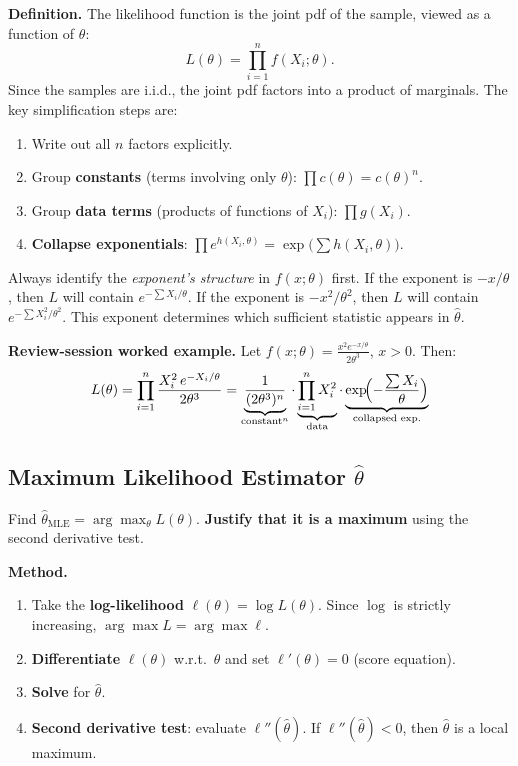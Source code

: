 \documentclass[11pt,a4paper]{article}
\begin{document}
\textbf{Definition.} The likelihood function is the joint pdf of the sample, viewed as a function of $\theta$:
\[
  L(\theta) = \prod_{i=1}^n f(X_i;\theta).
\]
Since the samples are i.i.d., the joint pdf factors into a product of marginals. The key simplification steps are:

\begin{enumerate}[leftmargin=2em]
  \item Write out all $n$ factors explicitly.
  \item Group \textbf{constants} (terms involving only $\theta$): $\prod c(\theta) = c(\theta)^n$.
  \item Group \textbf{data terms} (products of functions of $X_i$): $\prod g(X_i)$.
  \item \textbf{Collapse exponentials}: $\prod e^{h(X_i,\theta)} = \exp\!\bigl(\sum h(X_i,\theta)\bigr)$.
\end{enumerate}

\begin{tcolorbox}[warnbox, title={Critical point}]
Always identify the \emph{exponent's structure} in $f(x;\theta)$ first. If the exponent is $-x/\theta$, then $L$ will contain $e^{-\sum X_i/\theta}$. If the exponent is $-x^2/\theta^2$, then $L$ will contain $e^{-\sum X_i^2/\theta^2}$. This exponent determines which sufficient statistic appears in $\hat\theta$.
\end{tcolorbox}

\textbf{Review-session worked example.} Let $f(x;\theta) = \frac{x^2 e^{-x/\theta}}{2\theta^3}$, $x>0$. Then:
\[
  L(\theta) = \prod_{i=1}^n \frac{X_i^2\,e^{-X_i/\theta}}{2\theta^3}
  = \underbrace{\frac{1}{(2\theta^3)^n}}_{\text{constant}^n}
    \cdot \underbrace{\prod_{i=1}^n X_i^2}_{\text{data}}
    \cdot \underbrace{\exp\!\Bigl(-\frac{\sum X_i}{\theta}\Bigr)}_{\text{collapsed exp.}}
\]

\subsection{Maximum Likelihood Estimator $\hat\theta$}

\begin{tcolorbox}[questionbox, title={Question 2}]
Find $\hat\theta_{\text{MLE}} = \arg\max_\theta L(\theta)$. \textbf{Justify that it is a maximum} using the second derivative test.
\end{tcolorbox}

\textbf{Method.}
\begin{enumerate}[leftmargin=2em]
  \item Take the \textbf{log-likelihood} $\ell(\theta) = \log L(\theta)$. Since $\log$ is strictly increasing, $\arg\max L = \arg\max \ell$.
  \item \textbf{Differentiate} $\ell(\theta)$ w.r.t.\ $\theta$ and set $\ell'(\theta)=0$ (score equation).
  \item \textbf{Solve} for $\hat\theta$.
  \item \textbf{Second derivative test}: evaluate $\ell''(\hat\theta)$. If $\ell''(\hat\theta)<0$, then $\hat\theta$ is a local maximum.
\end{enumerate}
\end{document}

